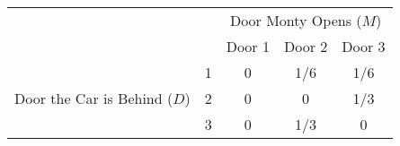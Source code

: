 \documentclass[border=2pt]{standalone}
\begin{document}
\begin{tabular}{lc|ccc}
    & & \multicolumn{3}{c}{Door Monty Opens ($M$)} \\ 
    & & Door 1 & Door 2 & Door 3 \\
    \hline
    & 1 & 0 & 1/6 & 1/6 \\ 
    Door the Car is Behind ($D$) & 2 & 0 & 0 & 1/3 \\ 
    & 3 & 0 & 1/3 & 0 \\ 
    \hline
\end{tabular}
\end{document}
